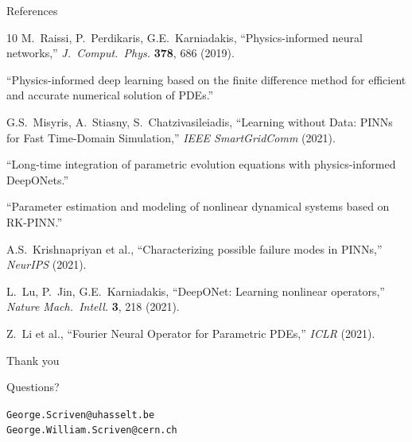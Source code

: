 \documentclass[aspectratio=169, 11pt]{beamer}
\begin{document}
\begin{frame}[allowframebreaks]{References}
  \small
  \begin{thebibliography}{10}
    M.~Raissi, P.~Perdikaris, G.E.~Karniadakis,
    ``Physics-informed neural networks,''
    \textit{J.~Comput.~Phys.} \textbf{378}, 686 (2019).

    ``Physics-informed deep learning based on the finite difference method for efficient and accurate numerical solution of PDEs.''

    G.S.~Misyris, A.~Stiasny, S.~Chatzivasileiadis,
    ``Learning without Data: PINNs for Fast Time-Domain Simulation,''
    \textit{IEEE SmartGridComm} (2021).

    ``Long-time integration of parametric evolution equations with physics-informed DeepONets.''

    ``Parameter estimation and modeling of nonlinear dynamical systems based on RK-PINN.''

    A.S.~Krishnapriyan et al.,
    ``Characterizing possible failure modes in PINNs,''
    \textit{NeurIPS} (2021).

    L.~Lu, P.~Jin, G.E.~Karniadakis,
    ``DeepONet: Learning nonlinear operators,''
    \textit{Nature Mach.~Intell.} \textbf{3}, 218 (2021).

    Z.~Li et al.,
    ``Fourier Neural Operator for Parametric PDEs,''
    \textit{ICLR} (2021).
  \end{thebibliography}
\end{frame}

\begin{frame}[plain]
  \centering
  \vfill
  {\Huge\textcolor{lhcbblue}{Thank you}}

  \bigskip
  {\large Questions?}

  \bigskip
  \small
  \texttt{George.Scriven@uhasselt.be} \\
  \texttt{George.William.Scriven@cern.ch}
  \vfill
\end{frame}
\end{document}
